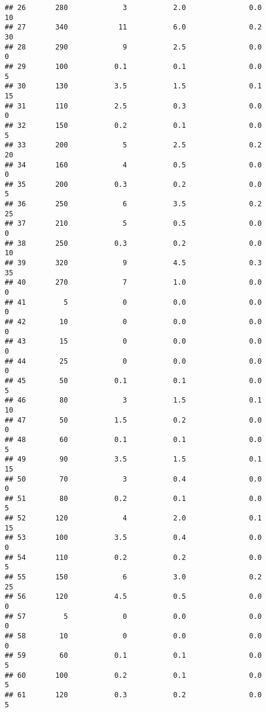 \documentclass[
]{article}
\begin{document}
\begin{verbatim}
## 26       280             3           2.0               0.0          10
## 27       340            11           6.0               0.2          30
## 28       290             9           2.5               0.0           0
## 29       100           0.1           0.1               0.0           5
## 30       130           3.5           1.5               0.1          15
## 31       110           2.5           0.3               0.0           0
## 32       150           0.2           0.1               0.0           5
## 33       200             5           2.5               0.2          20
## 34       160             4           0.5               0.0           0
## 35       200           0.3           0.2               0.0           5
## 36       250             6           3.5               0.2          25
## 37       210             5           0.5               0.0           0
## 38       250           0.3           0.2               0.0          10
## 39       320             9           4.5               0.3          35
## 40       270             7           1.0               0.0           0
## 41         5             0           0.0               0.0           0
## 42        10             0           0.0               0.0           0
## 43        15             0           0.0               0.0           0
## 44        25             0           0.0               0.0           0
## 45        50           0.1           0.1               0.0           5
## 46        80             3           1.5               0.1          10
## 47        50           1.5           0.2               0.0           0
## 48        60           0.1           0.1               0.0           5
## 49        90           3.5           1.5               0.1          15
## 50        70             3           0.4               0.0           0
## 51        80           0.2           0.1               0.0           5
## 52       120             4           2.0               0.1          15
## 53       100           3.5           0.4               0.0           0
## 54       110           0.2           0.2               0.0           5
## 55       150             6           3.0               0.2          25
## 56       120           4.5           0.5               0.0           0
## 57         5             0           0.0               0.0           0
## 58        10             0           0.0               0.0           0
## 59        60           0.1           0.1               0.0           5
## 60       100           0.2           0.1               0.0           5
## 61       120           0.3           0.2               0.0           5

\end{verbatim}
\end{document}
